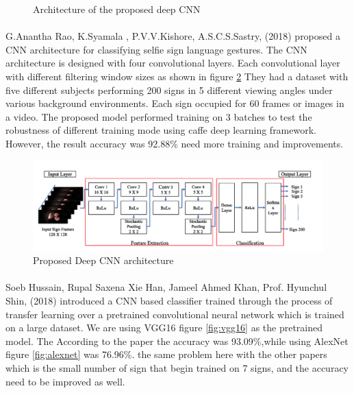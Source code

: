 \documentclass[12pt]{report}
\begin{document}
\begin{figure}
\begin{subfigure}[b]{0.3\textwidth}
                    \end{subfigure}
                    \caption{Architecture of the proposed deep CNN }\label{fig:tiny_architecture}
                \end{figure}

                \newpage

                \paragraph{}
                G.Anantha Rao, K.Syamala , P.V.V.Kishore, A.S.C.S.Sastry, (2018)
                proposed a CNN architecture for classifying selfie sign language gestures. 
                The CNN architecture is designed with four convolutional layers. Each convolutional 
                layer with different filtering window sizes as shown in figure \ref{fig:selfie}  
                They had a dataset with five different subjects performing 200 signs in 5 different viewing angles 
                under various background environments. Each sign occupied for 60 frames or images in a video.
                The proposed model performed training on 3 batches to test the robustness of different training mode 
                using caffe deep learning framework. However, the result accuracy was 92.88\% need more training and improvements. 
    
                    \begin{figure}[h]
                        \centering
                        \includegraphics[width=\textwidth]{./images/selfie.png}
                        \caption{Proposed Deep CNN architecture}
                        \label{fig:selfie}
                    \end{figure}
                    \newpage
            
                \paragraph{}
                Soeb Hussain, Rupal Saxena Xie Han, Jameel Ahmed Khan, Prof. Hyunchul Shin, (2018)
                introduced a CNN based classifier  trained through the process of transfer learning
                over a pretrained convolutional neural network which is trained on a large dataset.
                We are using VGG16 figure \ref{fig:vgg16} as the pretrained model.
                The According to the paper the accuracy was 93.09\%,while using AlexNet 
                figure \ref{fig:alexnet} was 76.96\%. the same problem here with the other papers 
                which is the small number of sign that begin trained on 7 signs, and the accuracy
                need to be improved as well.
\end{document}

